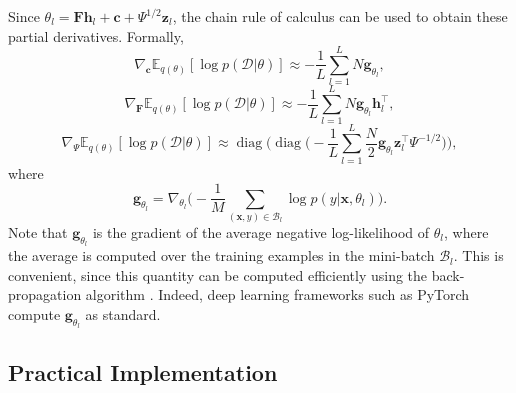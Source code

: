 \documentclass[msc,deptreport.inf]{infthesis} %
\newcommand{\matr}[1]{\mathbf{#1}}
\newcommand{\E}{\mathbb E}
\newcommand{\diag}{\mathop{\mathrm{diag}}}
\begin{document}
Since $\theta_l = \matr{F}\matr{h}_l + \matr{c} + \Psi^{1/2} \matr{z}_l$, the chain rule of calculus can be used to obtain these partial derivatives. Formally,
\begin{equation}
	 \nabla_\matr{c} \E_{q(\theta)} [\log p(\mathcal{D} | \theta)]
	 \approx -\frac{1}{L} \sum_{l=1}^{L} N \matr{g}_{\theta_l},
\end{equation}
\begin{equation}
	 \nabla_\matr{F} \E_{q(\theta)} [\log p(\mathcal{D} | \theta)]
	 \approx -\frac{1}{L} \sum_{l=1}^{L} N \matr{g}_{\theta_l} \matr{h}_l^\intercal,
\end{equation}
\begin{equation}\label{eqn:grad_likelihood_wrt_psi}
	 \nabla_\Psi \E_{q(\theta)} [\log p(\mathcal{D} | \theta)]
	 \approx \diag\Bigg( \diag\Bigg( -\frac{1}{L} \sum_{l=1}^{L} \frac{N}{2} \matr{g}_{\theta_l} \matr{z}_l^\intercal \Psi^{-1/2} \Bigg)\Bigg),
\end{equation}
where
\begin{equation}
	\matr{g}_{\theta_l} = \nabla_{\theta_l} \Bigg( -\frac{1}{M} \sum_{(\matr{x}, y) \in \mathcal{B}_l} \log p(y | \matr{x}, \theta_l) \Bigg).
\end{equation}
Note that $\matr{g}_{\theta_l}$ is the gradient of the average negative log-likelihood of $\theta_l$, where the average is computed over the training examples in the mini-batch $\mathcal{B}_l$. This is convenient, since this quantity can be computed efficiently using the back-propagation algorithm \cite{rumelhart1986}. Indeed, deep learning frameworks such as PyTorch \cite{paszke2019} compute $\matr{g}_{\theta_l}$ as standard. 


\subsection{Practical Implementation}
\end{document}
